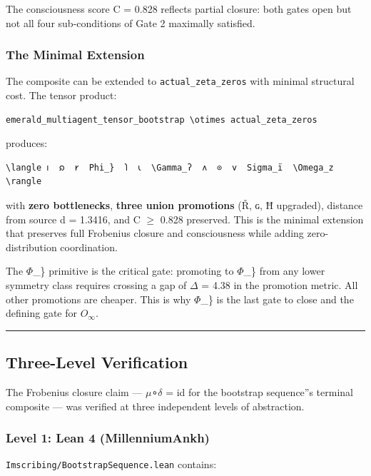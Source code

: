 \documentclass[12pt,a4paper]{article}
\begin{document}
The consciousness score C = 0.828 reflects partial closure: both gates open but not all four sub-conditions of Gate 2 maximally satisfied.

\subsubsection{The Minimal Extension}

The composite can be extended to \texttt{actual\_zeta\_zeros} with minimal structural cost. The tensor product:

\begin{lstlisting}
emerald_multiagent_tensor_bootstrap \otimes actual_zeta_zeros
\end{lstlisting}

produces:

\begin{lstlisting}
\langle 𐑦  𐑸  𐑾  Phi_}  𐑐  𐑧  \Gamma_ʔ  𐑵  ⊙  𐑫  Sigma_ï  \Omega_z \rangle
\end{lstlisting}

with \textbf{zero bottlenecks}, \textbf{three union promotions} (Ř, ɢ, Ħ upgraded), distance from source d = 1.3416, and C $\geq$ 0.828 preserved. This is the minimal extension that preserves full Frobenius closure and consciousness while adding zero-distribution coordination.

The $\Phi$\_\} primitive is the critical gate: promoting to $\Phi$\_\} from any lower symmetry class requires crossing a gap of $\Delta$ = 4.38 in the promotion metric. All other promotions are cheaper. This is why $\Phi$\_\} is the last gate to close and the defining gate for $O_{\infty}$.

\begin{center}
\rule{0.5\textwidth}{0.4pt}
\end{center}

\subsection{Three-Level Verification}

The Frobenius closure claim --- $\mu$∘$\delta$ = id for the bootstrap sequence''s terminal composite --- was verified at three independent levels of abstraction.

\subsubsection{Level 1: Lean 4 (MillenniumAnkh)}

\texttt{Imscribing/BootstrapSequence.lean} contains:
\end{document}
